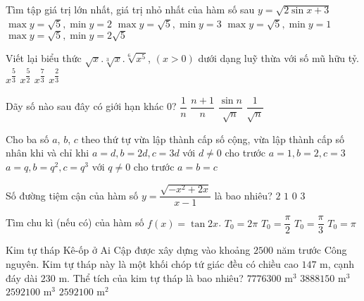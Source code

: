 \begin{ex}%
	Tìm tập giá trị lớn nhất, giá trị nhỏ nhất của hàm số sau $y=\sqrt{2\sin x+3}$
	\choice
	{$\max y =\sqrt{5}, \min y = 2$}
{$\max y =\sqrt{5}, \min y = 3$}
{\True $\max y =\sqrt{5}, \min y = 1$}
	{$\max y =\sqrt{5}, \min y = 2\sqrt{5}$}
\end{ex}
\begin{ex}%
	Viết lại biểu thức $\sqrt{x}.\sqrt[3]{x}.\sqrt[6]{x^5}$, $(x>0)$ dưới dạng luỹ thừa với số mũ hữu tỷ.
	\choice
	{\True $x^{\dfrac{5}{3}}$}
	{$x^{\dfrac{5}{2}}$}
	{$x^{\dfrac{7}{3}}$}
	{$x^{\dfrac{2}{3}}$}
\end{ex}
\begin{ex}%
Dãy số nào sau đây có giới hạn khác $0$?
	\choice
	{$\dfrac{1}{n}$}
	{\True $\dfrac{n+1}{n}$}
	{$\dfrac{\sin n}{\sqrt{n}}$}
	{$\dfrac{1}{\sqrt{n}}$}
\end{ex}
\begin{ex}%
	Cho ba số $a$, $b$, $c$ theo thứ tự vừa lập thành cấp số cộng, vừa lập thành cấp số nhân khi và chỉ khi
	\choice
	{$a=d, b=2d, c=3d$ với $d\ne 0$ cho trước}
	{$a=1, b=2, c=3$}
	{$a=q, b=q^2, c=q^3$ với $q\ne 0$ cho trước}
	{\True $a=b=c$}
\end{ex}
\begin{ex}%
Số đường tiệm cận của hàm số $y=\dfrac{\sqrt{-x^2+2x}}{x-1}$ là bao nhiêu?
	\choice
	{$2$}
	{\True $1$}
	{$0$}
	{$3$}
\end{ex}
\begin{ex}%
	Tìm chu kì (nếu có) của hàm số $f(x)=\tan {2x}$.
	\choice
	{$T_0=2\pi$}
	{\True $T_0=\dfrac{\pi}{2}$}
	{$T_0=\dfrac{\pi}{3}$}
	{$T_0=\pi$}
\end{ex}
\begin{ex}%
Kim tự tháp Kê-ốp ở Ai Cập được xây dựng vào khoảng $2500$ năm trước Công nguyên. Kim tự tháp này là một khối chóp tứ giác đều có chiều cao $147$ m, cạnh đáy dài $230$ m. Thể tích của kim tự tháp là bao nhiêu?
	\choice
	{$7776300$ m$^3$}
	{$3888150$ m$^3$}
	{\True $2592100$ m$^3$}
	{$2592100$ m$^2$}
\end{ex}

